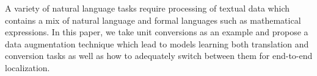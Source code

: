 A variety of natural language tasks require processing of textual data which contains a mix of natural language and formal languages such as mathematical expressions. In this paper, we take unit conversions as an example and propose a data augmentation technique which lead to models learning both translation and conversion tasks as well as how to adequately switch between them for end-to-end localization.
